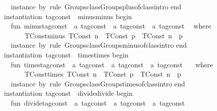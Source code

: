 \begin{isabellebody}
{\isanewline
\ \ instance\ by\ {\isacharparenleft}rule\ Groups{\isachardot}class{\isachardot}Groups{\isachardot}plus{\isachardot}of{\isacharunderscore}class{\isachardot}intro{\isacharparenright}\isanewline
end\isanewline
\isanewline
instantiation\ tag{\isacharunderscore}const\ {\isacharcolon}{\isacharcolon}\ {\isacharparenleft}minus{\isacharparenright}minus\isanewline
begin\isanewline
\ \ fun\ minus{\isacharunderscore}tag{\isacharunderscore}const\ {\isacharcolon}{\isacharcolon}\ {\isasymopen}{\isacharprime}a\ tag{\isacharunderscore}const\ {\isasymRightarrow}\ {\isacharprime}a\ tag{\isacharunderscore}const\ {\isasymRightarrow}\ {\isacharprime}a\ tag{\isacharunderscore}const{\isasymclose}\isanewline
\ \ where\isanewline
\ \ \ \ \ \ TConst{\isacharunderscore}minus{\isacharcolon}\ {\isasymopen}{\isacharparenleft}TConst\ n{\isacharparenright}\ {\isacharminus}\ {\isacharparenleft}TConst\ p{\isacharparenright}\ {\isacharequal}\ {\isacharparenleft}TConst\ {\isacharparenleft}n\ {\isacharminus}\ p{\isacharparenright}{\isacharparenright}{\isasymclose}\isanewline
\isanewline
\ \ instance\ by\ {\isacharparenleft}rule\ Groups{\isachardot}class{\isachardot}Groups{\isachardot}minus{\isachardot}of{\isacharunderscore}class{\isachardot}intro{\isacharparenright}\isanewline
end\isanewline
\isanewline
instantiation\ tag{\isacharunderscore}const\ {\isacharcolon}{\isacharcolon}\ {\isacharparenleft}times{\isacharparenright}times\isanewline
begin\isanewline
\ \ fun\ times{\isacharunderscore}tag{\isacharunderscore}const\ {\isacharcolon}{\isacharcolon}\ {\isasymopen}{\isacharprime}a\ tag{\isacharunderscore}const\ {\isasymRightarrow}\ {\isacharprime}a\ tag{\isacharunderscore}const\ {\isasymRightarrow}\ {\isacharprime}a\ tag{\isacharunderscore}const{\isasymclose}\ \isanewline
\ \ where\isanewline
\ \ \ \ \ \ TConst{\isacharunderscore}times{\isacharcolon}\ {\isasymopen}{\isacharparenleft}TConst\ n{\isacharparenright}\ {\isacharasterisk}\ {\isacharparenleft}TConst\ p{\isacharparenright}\ {\isacharequal}\ {\isacharparenleft}TConst\ {\isacharparenleft}n\ {\isacharasterisk}\ p{\isacharparenright}{\isacharparenright}{\isasymclose}\isanewline
\isanewline
\ \ instance\ by\ {\isacharparenleft}rule\ Groups{\isachardot}class{\isachardot}Groups{\isachardot}times{\isachardot}of{\isacharunderscore}class{\isachardot}intro{\isacharparenright}\isanewline
end\isanewline
\isanewline
instantiation\ tag{\isacharunderscore}const\ {\isacharcolon}{\isacharcolon}\ {\isacharparenleft}divide{\isacharparenright}divide\isanewline
begin\isanewline
\ \ fun\ divide{\isacharunderscore}tag{\isacharunderscore}const\ {\isacharcolon}{\isacharcolon}\ {\isasymopen}{\isacharprime}a\ tag{\isacharunderscore}const\ {\isasymRightarrow}\ {\isacharprime}a\ tag{\isacharunderscore}const\ {\isasymRightarrow}\ {\isacharprime}a\ tag{\isacharunderscore}const{\isasymclose}\ \isanewline
}
\end{isabellebody}

